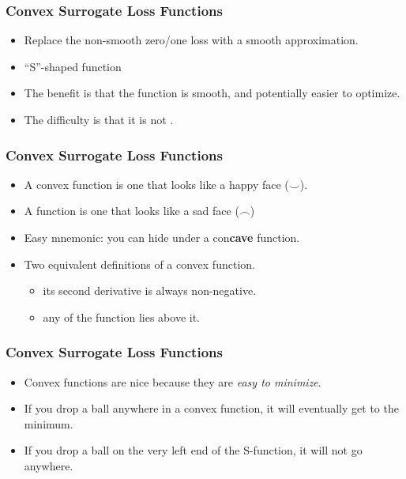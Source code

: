 \documentclass[trans]{beamer}
\begin{document}
\begin{frame}
  \frametitle{Convex Surrogate Loss Functions}
\begin{itemize}
\item Replace the non-smooth zero/one loss with a smooth approximation.
\item  ``S''-shaped
function 
\item The
benefit  is that the function is smooth, and
potentially easier to optimize. 
\item The difficulty is that it is not
.
\end{itemize}
\end{frame}

\begin{frame}
  \frametitle{Convex Surrogate Loss Functions}
\begin{itemize}
\item 
A convex function is one that looks
like a happy face ($\smile$).
\item A 
function is one that looks like a sad face ($\frown$)
\item Easy
mnemonic:  you can hide under a con{\bf cave} function.
\item Two equivalent definitions of a convex function. 
\begin{itemize}
\item its second derivative is always non-negative.  
\item any  of the function lies
above it.
\end{itemize}
\end{itemize}
\end{frame}

\begin{frame}
  \frametitle{Convex Surrogate Loss Functions}
\begin{itemize}
\item 
Convex functions are nice because they are \emph{easy to minimize}.
\item If you drop a ball anywhere in a convex function, it will
eventually get to the minimum.  
\item If you drop a ball on the very left end of
the S-function, it will not
go anywhere.
\end{itemize}
\end{frame}
\end{document}
